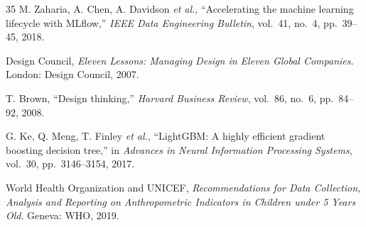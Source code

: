 \begin{thebibliography}{35}
M. Zaharia, A. Chen, A. Davidson \emph{et al.}, ``Accelerating the machine learning lifecycle with MLflow,'' \emph{IEEE Data Engineering Bulletin}, vol.~41, no.~4, pp.~39--45, 2018.

Design Council, \emph{Eleven Lessons: Managing Design in Eleven Global Companies}. London: Design Council, 2007.

T. Brown, ``Design thinking,'' \emph{Harvard Business Review}, vol.~86, no.~6, pp.~84--92, 2008.

G. Ke, Q. Meng, T. Finley \emph{et al.}, ``LightGBM: A highly efficient gradient boosting decision tree,'' in \emph{Advances in Neural Information Processing Systems}, vol.~30, pp.~3146--3154, 2017.

World Health Organization and UNICEF, \emph{Recommendations for Data Collection, Analysis and Reporting on Anthropometric Indicators in Children under 5 Years Old}. Geneva: WHO, 2019.

\end{thebibliography}
